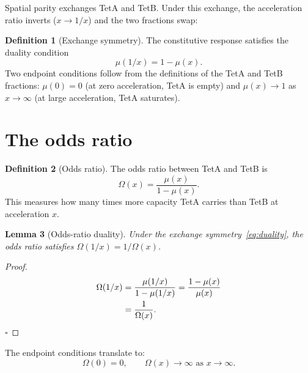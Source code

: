 \documentclass[twocolumn]{iopjournal}
\newtheorem{lemma}{Lemma}
\theoremstyle{definition}
\newtheorem{definition}[lemma]{Definition}
\begin{document}
\noindent
Spatial parity exchanges TetA and TetB.  Under this exchange,
the acceleration ratio inverts ($x \to 1/x$) and the two
fractions swap:

\begin{definition}[Exchange symmetry]
\label{def:exchange}
The constitutive response satisfies the duality condition
\begin{equation}
  \mu(1/x) = 1 - \mu(x).
  \label{eq:duality}
\end{equation}
Two endpoint conditions follow from the definitions of the
TetA and TetB fractions:
$\mu(0) = 0$ (at zero acceleration, TetA is empty) and
$\mu(x) \to 1$ as $x \to \infty$ (at large acceleration,
TetA saturates).
\end{definition}


\section*{The odds ratio}

\begin{definition}[Odds ratio]
\label{def:odds}
The odds ratio between TetA and TetB is
\begin{equation}
  \Omega(x) = \frac{\mu(x)}{1 - \mu(x)}.
  \label{eq:odds}
\end{equation}
This measures how many times more capacity TetA carries than
TetB at acceleration $x$.
\end{definition}

\begin{lemma}[Odds-ratio duality]
\label{lem:odds_duality}
Under the exchange symmetry~\eqref{eq:duality}, the odds ratio
satisfies $\Omega(1/x) = 1/\Omega(x)$.
\end{lemma}

\begin{proof}
\begin{align}
  \Omega(1/x)
  &= \frac{\mu(1/x)}{1 - \mu(1/x)}
   = \frac{1 - \mu(x)}{\mu(x)} \notag \\
  &= \frac{1}{\Omega(x)}.
\end{align}
\hfill$\square$
\end{proof}

\noindent
The endpoint conditions translate to:
\begin{equation}
  \Omega(0) = 0, \qquad \Omega(x) \to \infty
  \text{ as } x \to \infty.
  \label{eq:odds_endpoints}
\end{equation}
\end{document}
